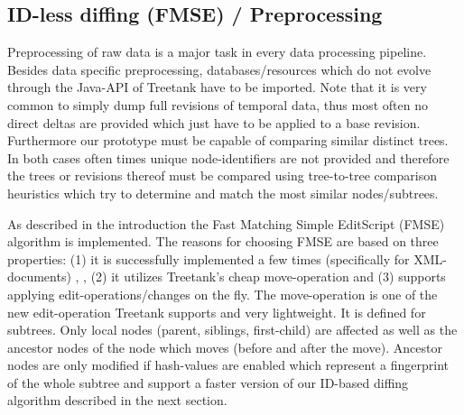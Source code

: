 

\subsection{ID-less diffing (FMSE) / Preprocessing}
Preprocessing of raw data is a major task in every data processing pipeline. Besides data specific preprocessing, databases/resources which do not evolve through the Java-API of Treetank have to be imported. Note that it is very common to simply dump full revisions of temporal data, thus most often no direct deltas are provided which just have to be applied to a base revision. Furthermore our prototype must be capable of comparing similar distinct trees. In both cases often times unique node-identifiers are not provided and therefore the trees or revisions thereof must be compared using tree-to-tree comparison heuristics which try to determine and match the most similar nodes/subtrees. %

As described in the introduction the Fast Matching Simple EditScript (FMSE) algorithm is implemented. The reasons for choosing FMSE are based on three properties: (1) it is successfully implemented a few times (specifically for XML-documents) \cite{xmldiff}, \cite{diffxml}, (2) it utilizes Treetank's cheap move-operation and (3) supports applying edit-operations/changes on the fly. The move-operation is one of the new edit-operation Treetank supports and very lightweight. It is defined for subtrees. Only local nodes (parent, siblings, first-child) are affected as well as the ancestor nodes of the node which moves (before and after the move). Ancestor nodes are only modified if hash-values are enabled which represent a fingerprint of the whole subtree and support a faster version of our ID-based diffing algorithm described in the next section. 


